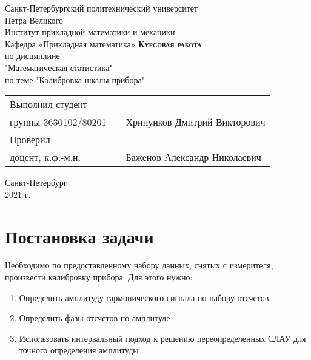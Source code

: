 \documentclass[12pt,a4paper]{article}
\begin{document}
    \begin{titlepage}
        \begin{center}
            \large
            Санкт-Петербургский политехнический университет\\Петра Великого\\
            \vspace{0.5cm}
            Институт прикладной математики и механики\\
            \vspace{0.25cm}
            Кафедра «Прикладная математика»
            \vfill
            \textsc{\LARGE\textbf{Курсовая работа}}\\[5mm]
            \Large
            по дисциплине\\"Математическая статистика"\\
            по теме "Калибровка шкалы прибора"
        \end{center}
        \vfill
        \begin{tabular}{l p{175pt} l}
            Выполнил студент \\ группы 3630102/80201 && Хрипунков Дмитрий Викторович
            \vspace{0.25cm}
            \\Проверил \\ доцент, к.ф.-м.н. && Баженов Александр Николаевич
        \end{tabular}
        \vfill
        \begin{center}
            Санкт-Петербург \\ 2021 г.
        \end{center}
    \end{titlepage}
    
\newpage
\begin{center}
    \tableofcontents
    \setcounter{page}{2}
\end{center}
\newpage
\begin{center}
    \listoffigures
\end{center}

\newpage
\section{Постановка задачи}
Необходимо по предоставленному набору данных, снятых с измерителя, произвести калибровку прибора. Для этого нужно:
\begin{enumerate}
    \item Определить амплитуду гармонического сигнала по набору отсчетов
    \item Определить фазы отсчетов по амплитуде
    \item Использовать интервальный подход к решению переопределенных СЛАУ для точного определения амплитуды
\end{enumerate}
\end{document}
